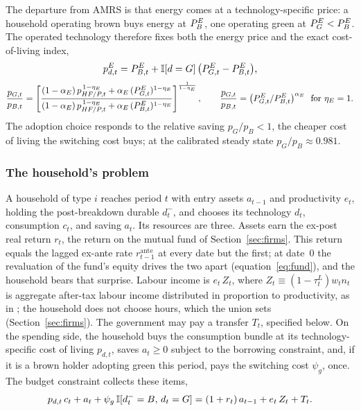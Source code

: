 The departure from AMRS is that energy comes at a technology-specific price: a
household operating brown buys energy at $\PEB$, one operating green at $\PEG<\PEB$.
The operated technology therefore fixes both the energy price and the exact
cost-of-living index,
%
\begin{equation}
p^E_{d,t}=\PEB[,t]+\I[d=G]\,\bigl(\PEG[,t]-\PEB[,t]\bigr),
\label{eq:pEd}
\end{equation}
\begin{equation}
\frac{p_{G,t}}{p_{B,t}}=\left[\frac{(1-\alpha_E)\,p_{HF/P,t}^{\,1-\eta_E}+\alpha_E\,(\PEG[,t])^{1-\eta_E}}
{(1-\alpha_E)\,p_{HF/P,t}^{\,1-\eta_E}+\alpha_E\,(\PEB[,t])^{1-\eta_E}}\right]^{\frac{1}{1-\eta_E}},
\qquad
\frac{p_{G,t}}{p_{B,t}}=\bigl(\PEG[,t]/\PEB[,t]\bigr)^{\alpha_E}\ \text{ for }\eta_E=1.
\label{eq:pd}
\end{equation}
%
The adoption choice responds to the relative saving $p_G/p_B<1$, the cheaper cost
of living the switching cost buys; at the calibrated steady state $p_G/p_B\approx0.981$.

\subsubsection{The household's problem}\label{sec:problem}

A household of type $i$ reaches period $t$ with entry assets $a_{t-1}$ and
productivity $e_t$, holding the post-breakdown durable $d^-_t$, and chooses its
technology $d_t$, consumption $c_t$, and saving $a_t$. Its resources are three.
Assets earn the ex-post real return $r_t$,
the return on the mutual fund of Section~\ref{sec:firms}. This return equals the
lagged ex-ante rate $r^{\mathrm{ante}}_{t-1}$ at every date but the first; at
date~0 the revaluation of the fund's equity drives the two apart
(equation~\eqref{eq:fund}), and the household bears that surprise. Labour income is $e_t\,Z_t$, where $Z_t\equiv(1-\tau^L_t)w_t n_t$
is aggregate after-tax labour income distributed in proportion to productivity, as in
\citet{auclert2023energy}; the household does not choose hours, which the union sets
(Section~\ref{sec:firms}). The government may pay a transfer $T_t$, specified below. On
the spending side, the household buys the consumption bundle at its
technology-specific cost of living $p_{d,t}$, saves $a_t\ge0$ subject to the borrowing
constraint, and, if it is a brown holder adopting green this period, pays the
switching cost $\psi_g$, once. The budget constraint collects these
items,
%
\begin{equation}
p_{d,t}\,c_t+a_t+\psi_g\,\I[d^-_t=B,\,d_t=G]=(1+r_t)\,a_{t-1}+e_t\,Z_t+T_t.
\label{eq:coh}
\end{equation}

